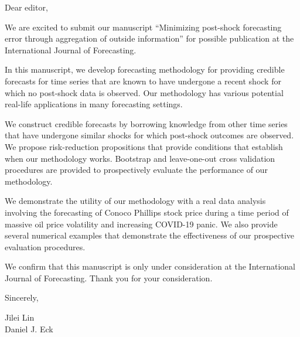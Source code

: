 \documentclass[11pt]{article}
\begin{document}
\footnotesize

\normalsize 


Dear editor,

We are excited to submit our manuscript ``Minimizing post-shock forecasting error through aggregation of outside information'' for possible publication at the International Journal of Forecasting. 

In this manuscript, we  develop forecasting methodology for providing credible forecasts for time series that are known to have undergone a recent shock for which no post-shock data is observed. Our methodology has various potential real-life applications in many forecasting settings. 

We construct credible forecasts by borrowing knowledge from other time series that have undergone similar shocks for which post-shock outcomes are observed. We propose risk-reduction propositions that provide conditions that establish when our methodology works. Bootstrap and leave-one-out cross validation procedures are provided to prospectively evaluate the performance of our methodology. 

We demonstrate the utility of our methodology with a real data analysis involving the forecasting of Conoco Phillips stock price during a time period of massive oil price volatility and increasing COVID-19 panic. We also provide several numerical examples that demonstrate the effectiveness of our prospective evaluation procedures. 

We confirm that this manuscript is only under consideration at the International Journal of Forecasting. Thank you for your consideration.

Sincerely,

Jilei Lin \\
Daniel J. Eck 
\end{document}
